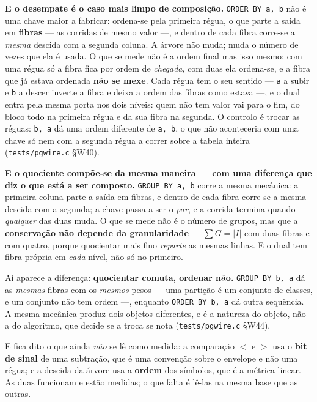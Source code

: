 \documentclass[11pt,a4paper]{article}
\newcommand{\code}[1]{\texttt{\small #1}}
\begin{document}
\medskip\noindent\textbf{E o desempate é o caso mais limpo de composição.}
\code{ORDER BY a, b} não é uma chave maior a fabricar: ordena-se pela primeira
régua, o que parte a saída em \textbf{fibras} --- as corridas de mesmo valor
---, e dentro de cada fibra corre-se a \emph{mesma} descida com a segunda
coluna. A árvore não muda; muda o número de vezes que ela é usada. O que se
mede não é a ordem final mas isso mesmo: com uma régua só a fibra fica por
ordem de \emph{chegada}, com duas ela ordena-se, e a fibra que já estava
ordenada \textbf{não se mexe}. Cada régua tem o seu sentido --- \code{a} a
subir e \code{b} a descer inverte a fibra e deixa a ordem das fibras como
estava ---, e o dual entra pela mesma porta nos dois níveis: quem não tem valor
vai para o fim, do bloco todo na primeira régua e da sua fibra na segunda. O
controlo é trocar as réguas: \code{b, a} dá uma ordem diferente de
\code{a, b}, o que não aconteceria com uma chave só nem com a segunda régua a
correr sobre a tabela inteira (\code{tests/pgwire.c} §W40).

\medskip\noindent\textbf{E o quociente compõe-se da mesma maneira --- com uma
diferença que diz o que está a ser composto.} \code{GROUP BY a, b} corre a
mesma mecânica: a primeira coluna parte a saída em fibras, e dentro de cada
fibra corre-se a mesma descida com a segunda; a chave passa a ser o \emph{par},
e a corrida termina quando \emph{qualquer} das duas muda. O que se mede não é o
número de grupos, mas que a \textbf{conservação não depende da granularidade}
--- $\sum G=\lvert I\rvert$ com duas fibras e com quatro, porque quocientar mais
fino \emph{reparte} as mesmas linhas. E o dual tem fibra própria em \emph{cada}
nível, não só no primeiro.

\medskip\noindent Aí aparece a diferença: \textbf{quocientar comuta, ordenar
não.} \code{GROUP BY b, a} dá as \emph{mesmas} fibras com os \emph{mesmos}
pesos --- uma partição é um conjunto de classes, e um conjunto não tem ordem
---, enquanto \code{ORDER BY b, a} dá outra sequência. A mesma mecânica produz
dois objetos diferentes, e é a natureza do objeto, não a do algoritmo, que
decide se a troca se nota (\code{tests/pgwire.c} §W44).

\medskip\noindent E fica dito o que ainda \emph{não} se lê como medida: a
comparação $<$ e $>$ usa o \textbf{bit de sinal} de uma subtração, que é uma
convenção sobre o envelope e não uma régua; e a descida da árvore usa a
\textbf{ordem} dos símbolos, que é a métrica linear. As duas funcionam e estão
medidas; o que falta é lê-las na mesma base que as outras.
\end{document}
